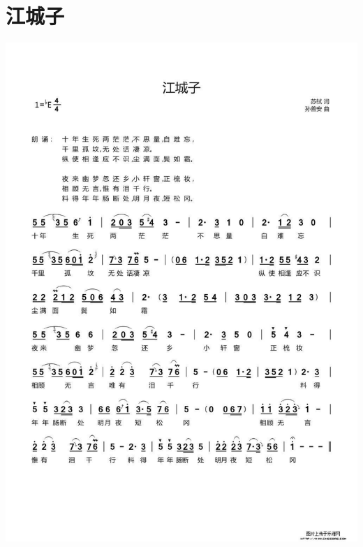 \documentclass[cn,pad,twocol]{elegantbook}
\begin{document}
\section{江城子}
    \includegraphics[width=\textwidth]{rpi400/20201230江城子.jpg}
\end{document}
